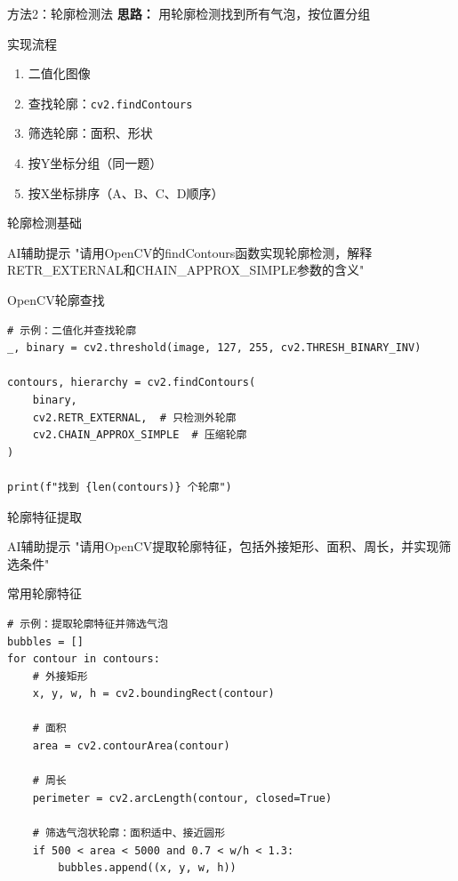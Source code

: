 \begin{frame}{方法2：轮廓检测法}
    \textbf{思路：} 用轮廓检测找到所有气泡，按位置分组

    \begin{block}{实现流程}
    \begin{enumerate}
        \item 二值化图像
        \item 查找轮廓：\texttt{cv2.findContours}
        \item 筛选轮廓：面积、形状
        \item 按Y坐标分组（同一题）
        \item 按X坐标排序（A、B、C、D顺序）
    \end{enumerate}
    \end{block}
\end{frame}

\begin{frame}[fragile]{轮廓检测基础}
    \begin{block}{AI辅助提示}
        \aihint{} "请用OpenCV的findContours函数实现轮廓检测，解释RETR_EXTERNAL和CHAIN_APPROX_SIMPLE参数的含义"
    \end{block}

    \begin{block}{OpenCV轮廓查找}
    \begin{lstlisting}
# 示例：二值化并查找轮廓
_, binary = cv2.threshold(image, 127, 255, cv2.THRESH_BINARY_INV)

contours, hierarchy = cv2.findContours(
    binary,
    cv2.RETR_EXTERNAL,  # 只检测外轮廓
    cv2.CHAIN_APPROX_SIMPLE  # 压缩轮廓
)

print(f"找到 {len(contours)} 个轮廓")
    \end{lstlisting}
    \end{block}
\end{frame}

\begin{frame}[fragile]{轮廓特征提取}
    \begin{block}{AI辅助提示}
        \aihint{} "请用OpenCV提取轮廓特征，包括外接矩形、面积、周长，并实现筛选条件"
    \end{block}

    \begin{block}{常用轮廓特征}
    \begin{lstlisting}
# 示例：提取轮廓特征并筛选气泡
bubbles = []
for contour in contours:
    # 外接矩形
    x, y, w, h = cv2.boundingRect(contour)

    # 面积
    area = cv2.contourArea(contour)

    # 周长
    perimeter = cv2.arcLength(contour, closed=True)

    # 筛选气泡状轮廓：面积适中、接近圆形
    if 500 < area < 5000 and 0.7 < w/h < 1.3:
        bubbles.append((x, y, w, h))
    \end{lstlisting}
    \end{block}
\end{frame}

